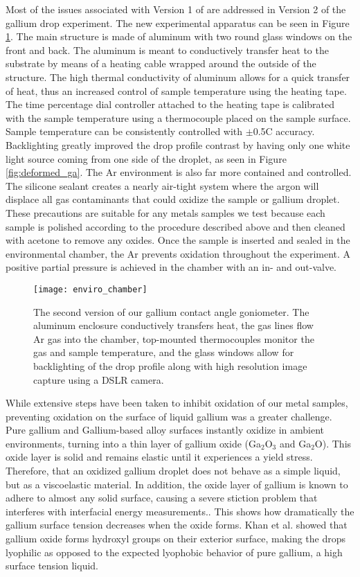Most of the issues associated with Version 1 of are addressed in Version 2 of the gallium drop experiment. The new experimental apparatus can be seen in Figure \ref{fig:enviro_chamber}. The main structure is made of aluminum with two round glass windows on the front and back. The aluminum is meant to conductively transfer heat to the substrate by means of a heating cable wrapped around the outside of the structure. The high thermal conductivity of aluminum allows for a quick transfer of heat, thus an increased control of sample temperature using the heating tape. The time percentage dial controller attached to the heating tape is calibrated with the sample temperature using a thermocouple placed on the sample surface. Sample temperature can be consistently controlled with $\pm$0.5\degree C accuracy. Backlighting greatly improved the drop profile contrast by having only one white light source coming from one side of the droplet, as seen in Figure \ref{fig:deformed_ga}. The Ar environment is also far more contained and controlled. The silicone sealant creates a nearly air-tight system where the argon will displace all gas contaminants that could oxidize the sample or gallium droplet. These precautions are suitable for any metals samples we test because each sample is polished according to the procedure described above and then cleaned with acetone to remove any oxides. Once the sample is inserted and sealed in the environmental chamber, the Ar prevents oxidation throughout the experiment. A positive partial pressure is achieved in the chamber with an in- and out-valve. %
\begin{figure}
	\centering
	\texttt{[image: enviro\_chamber]}
	\caption{The second version of our gallium contact angle goniometer. The aluminum enclosure conductively transfers heat, the gas lines flow Ar gas into the chamber, top-mounted thermocouples monitor the gas and sample temperature, and the glass windows allow for backlighting of the drop profile along with high resolution image capture using a DSLR camera.}
	\label{fig:enviro_chamber}
\end{figure}

While extensive steps have been taken to inhibit oxidation of our metal samples, preventing oxidation on the surface of liquid gallium was a greater challenge. Pure gallium and Gallium-based alloy surfaces instantly oxidize in ambient environments, turning into a thin layer of gallium oxide (Ga$_{2}$O$_{3}$ and Ga$_{2}$O).\cite{Regan1995,Regan1997,Scharmann2004} This oxide layer is solid and remains elastic until it experiences a yield stress. Therefore, that an oxidized gallium droplet does not behave as a simple liquid, but as a viscoelastic material. In addition, the oxide layer of gallium is known to adhere to almost any solid surface, causing a severe stiction problem that interferes with interfacial energy measurements.\cite{Scharmann2004}. This shows how dramatically the gallium surface tension decreases when the oxide forms. Khan et al. showed that gallium oxide forms hydroxyl groups on their exterior surface, making the drops lyophilic as opposed to the expected lyophobic behavior of pure gallium, a high surface tension liquid.\cite{Hardy1985,Alchagirov2005} 



